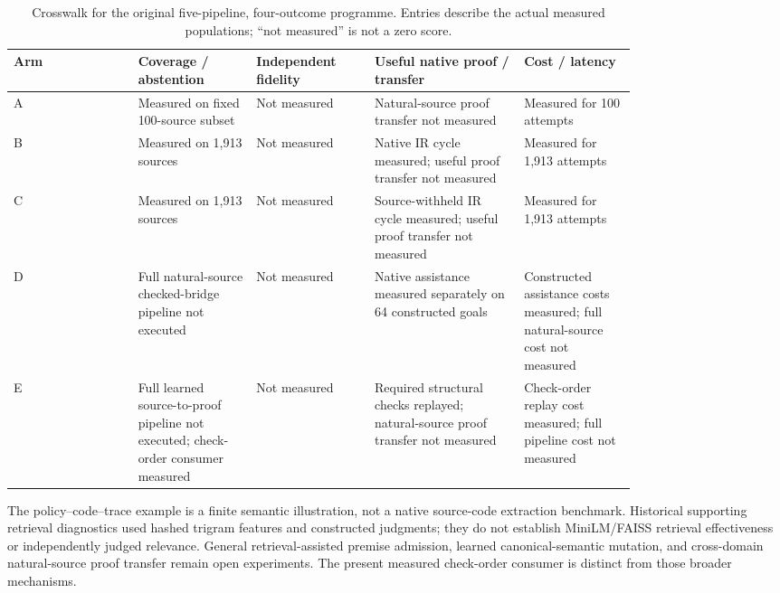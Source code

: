 \documentclass{article}
\begin{document}
\begin{table}[h]
\centering\small
\caption{Crosswalk for the original five-pipeline, four-outcome programme. Entries describe the actual measured populations; ``not measured'' is not a zero score.}
\label{tab:programme-crosswalk}
\begin{tabular}{l>{\raggedright\arraybackslash}p{0.19\linewidth}>{\raggedright\arraybackslash}p{0.19\linewidth}>{\raggedright\arraybackslash}p{0.24\linewidth}>{\raggedright\arraybackslash}p{0.18\linewidth}}\toprule
Arm & Coverage / abstention & Independent fidelity & Useful native proof / transfer & Cost / latency\\\midrule
A & Measured on fixed 100-source subset & Not measured & Natural-source proof transfer not measured & Measured for 100 attempts\\
B & Measured on 1,913 sources & Not measured & Native IR cycle measured; useful proof transfer not measured & Measured for 1,913 attempts\\
C & Measured on 1,913 sources & Not measured & Source-withheld IR cycle measured; useful proof transfer not measured & Measured for 1,913 attempts\\
D & Full natural-source checked-bridge pipeline not executed & Not measured & Native assistance measured separately on 64 constructed goals & Constructed assistance costs measured; full natural-source cost not measured\\
E & Full learned source-to-proof pipeline not executed; check-order consumer measured & Not measured & Required structural checks replayed; natural-source proof transfer not measured & Check-order replay cost measured; full pipeline cost not measured\\\bottomrule
\end{tabular}
\end{table}

The policy--code--trace example is a finite semantic illustration, not a native source-code extraction benchmark. Historical supporting retrieval diagnostics used hashed trigram features and constructed judgments; they do not establish MiniLM/FAISS retrieval effectiveness or independently judged relevance. General retrieval-assisted premise admission, learned canonical-semantic mutation, and cross-domain natural-source proof transfer remain open experiments. The present measured check-order consumer is distinct from those broader mechanisms.


\clearpage

\end{document}
